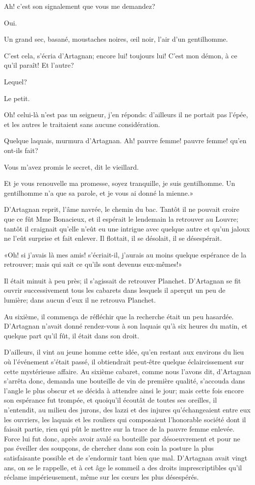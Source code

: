\speak  Ah! c'est son signalement que vous me demandez? 

\speak  Oui. 

\speak  Un grand sec, basané, moustaches noires, œil noir, l'air d'un gentilhomme. 

\speak  C'est cela, s'écria d'Artagnan; encore lui! toujours lui! C'est mon démon, à ce qu'il paraît! Et l'autre? 

\speak  Lequel? 

\speak  Le petit. 

\speak  Oh! celui-là n'est pas un seigneur, j'en réponds: d'ailleurs il ne portait pas l'épée, et les autres le traitaient sans aucune considération. 

\speak  Quelque laquais, murmura d'Artagnan. Ah! pauvre femme! pauvre femme! qu'en ont-ils fait? 

\speak  Vous m'avez promis le secret, dit le vieillard. 

\speak  Et je vous renouvelle ma promesse, soyez tranquille, je suis gentilhomme. Un gentilhomme n'a que sa parole, et je vous ai donné la mienne.» 

D'Artagnan reprit, l'âme navrée, le chemin du bac. Tantôt il ne pouvait croire que ce fût Mme Bonacieux, et il espérait le lendemain la retrouver au Louvre; tantôt il craignait qu'elle n'eût eu une intrigue avec quelque autre et qu'un jaloux ne l'eût surprise et fait enlever. Il flottait, il se désolait, il se désespérait. 

«Oh! si j'avais là mes amis! s'écriait-il, j'aurais au moins quelque espérance de la retrouver; mais qui sait ce qu'ils sont devenus eux-mêmes!» 

Il était minuit à peu près; il s'agissait de retrouver Planchet. D'Artagnan se fit ouvrir successivement tous les cabarets dans lesquels il aperçut un peu de lumière; dans aucun d'eux il ne retrouva Planchet. 

Au sixième, il commença de réfléchir que la recherche était un peu hasardée. D'Artagnan n'avait donné rendez-vous à son laquais qu'à six heures du matin, et quelque part qu'il fût, il était dans son droit. 

D'ailleurs, il vint au jeune homme cette idée, qu'en restant aux environs du lieu où l'événement s'était passé, il obtiendrait peut-être quelque éclaircissement sur cette mystérieuse affaire. Au sixième cabaret, comme nous l'avons dit, d'Artagnan s'arrêta donc, demanda une bouteille de vin de première qualité, s'accouda dans l'angle le plus obscur et se décida à attendre ainsi le jour; mais cette fois encore son espérance fut trompée, et quoiqu'il écoutât de toutes ses oreilles, il n'entendit, au milieu des jurons, des lazzi et des injures qu'échangeaient entre eux les ouvriers, les laquais et les rouliers qui composaient l'honorable société dont il faisait partie, rien qui pût le mettre sur la trace de la pauvre femme enlevée. Force lui fut donc, après avoir avalé sa bouteille par désoeuvrement et pour ne pas éveiller des soupçons, de chercher dans son coin la posture la plus satisfaisante possible et de s'endormir tant bien que mal. D'Artagnan avait vingt ans, on se le rappelle, et à cet âge le sommeil a des droits imprescriptibles qu'il réclame impérieusement, même sur les cœurs les plus désespérés. 

